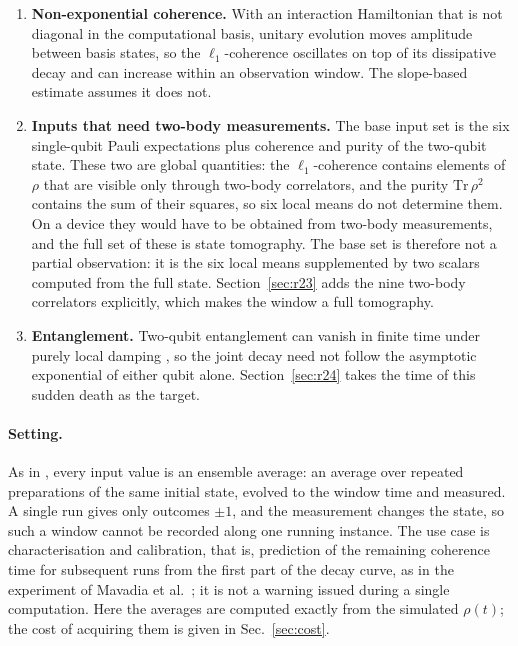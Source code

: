 \documentclass[twocolumn,10pt]{article}
\begin{document}
\begin{enumerate}
  \item \textbf{Non-exponential coherence.}
    With an interaction Hamiltonian that is not diagonal in the
    computational basis, unitary evolution moves amplitude between basis
    states, so the $\ell_1$-coherence oscillates on top of its
    dissipative decay and can increase within an observation window.
    The slope-based estimate assumes it does not.
  \item \textbf{Inputs that need two-body measurements.}
    The base input set is the six single-qubit Pauli expectations plus
    coherence and purity of the two-qubit state. These two are global
    quantities: the $\ell_1$-coherence contains elements of $\rho$ that
    are visible only through two-body correlators, and the purity
    $\mathrm{Tr}\,\rho^2$ contains the sum of their squares, so six local
    means do not determine them. On a device they would have to be
    obtained from two-body measurements, and the full set of these is
    state tomography. The base set is therefore not a partial
    observation: it is the six local means supplemented by two scalars
    computed from the full state. Section~\ref{sec:r23} adds the nine
    two-body correlators explicitly, which makes the window a full
    tomography.
  \item \textbf{Entanglement.}
    Two-qubit entanglement can vanish in finite time under purely local
    damping \cite{YuEberly2009}, so the joint decay need not follow the
    asymptotic exponential of either qubit alone. Section~\ref{sec:r24}
    takes the time of this sudden death as the target.
\end{enumerate}

\paragraph{Setting.}
As in \cite{Paper1Brusnikin}, every input value is an ensemble average:
an average over repeated preparations of the same initial state, evolved
to the window time and measured. A single run gives only outcomes $\pm1$,
and the measurement changes the state, so such a window cannot be
recorded along one running instance. The use case is characterisation and
calibration, that is, prediction of the remaining coherence time for
subsequent runs from the first part of the decay curve, as in the
experiment of Mavadia et al.~\cite{Mavadia2017}; it is not a warning
issued during a single computation. Here the averages are computed
exactly from the simulated $\rho(t)$; the cost of acquiring them is given
in Sec.~\ref{sec:cost}.
\end{document}
